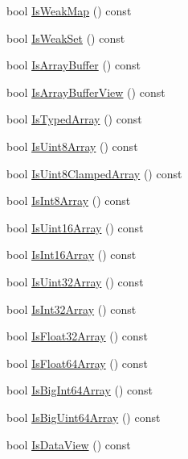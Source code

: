\begin{DoxyCompactItemize}
\item 
bool \mbox{\hyperlink{classv8_1_1Value_a3be1c8f103d9aa9b31b3b1c56905337d}{Is\+Weak\+Map}} () const
\item 
bool \mbox{\hyperlink{classv8_1_1Value_a66c2dbb0ed13325f0f9e6b38e5e1992c}{Is\+Weak\+Set}} () const
\item 
bool \mbox{\hyperlink{classv8_1_1Value_a62c732277023d09f5e5a54eaa2846853}{Is\+Array\+Buffer}} () const
\item 
bool \mbox{\hyperlink{classv8_1_1Value_ab1ba4b263da3630cf8efd0c6b6e26293}{Is\+Array\+Buffer\+View}} () const
\item 
bool \mbox{\hyperlink{classv8_1_1Value_a01183cf30ba5e6383cdca82daee630d8}{Is\+Typed\+Array}} () const
\item 
bool \mbox{\hyperlink{classv8_1_1Value_af11d828f1a78df0de696e210571b7860}{Is\+Uint8\+Array}} () const
\item 
bool \mbox{\hyperlink{classv8_1_1Value_a655a46fa71c8a33d138756d8a6c515ac}{Is\+Uint8\+Clamped\+Array}} () const
\item 
bool \mbox{\hyperlink{classv8_1_1Value_ad9c2858387a0cafe3628f0533a9bbf6a}{Is\+Int8\+Array}} () const
\item 
bool \mbox{\hyperlink{classv8_1_1Value_af3e8da420ddc0f92aac5dbfe61ac9699}{Is\+Uint16\+Array}} () const
\item 
bool \mbox{\hyperlink{classv8_1_1Value_a8db779f4ac104540e63d78e73d424195}{Is\+Int16\+Array}} () const
\item 
bool \mbox{\hyperlink{classv8_1_1Value_a52fe549df18b0c77a875d7aa61f87317}{Is\+Uint32\+Array}} () const
\item 
bool \mbox{\hyperlink{classv8_1_1Value_afd14729579f9768a7d3f8bc3db6c1d28}{Is\+Int32\+Array}} () const
\item 
bool \mbox{\hyperlink{classv8_1_1Value_aafedbffb06cdd267149f241ad7926d9d}{Is\+Float32\+Array}} () const
\item 
bool \mbox{\hyperlink{classv8_1_1Value_a7ed4de7b1d4467cdd69eb128b3ecfdf2}{Is\+Float64\+Array}} () const
\item 
bool \mbox{\hyperlink{classv8_1_1Value_a2a4c67e98ddf7b09060e226130f25fda}{Is\+Big\+Int64\+Array}} () const
\item 
bool \mbox{\hyperlink{classv8_1_1Value_a8a65d3cc71eebd50fa5cdc02fa2198f0}{Is\+Big\+Uint64\+Array}} () const
\item 
bool \mbox{\hyperlink{classv8_1_1Value_ad854ff95b445e924a4d78b1b1dc8054b}{Is\+Data\+View}} () const
\item 

\end{DoxyCompactItemize}
